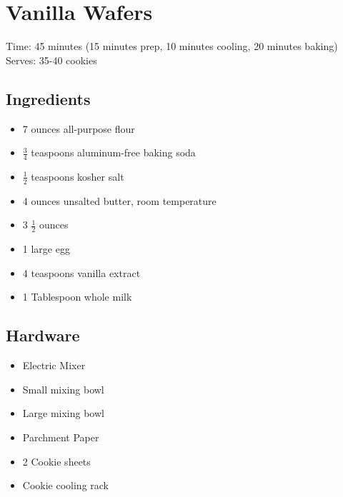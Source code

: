 \section{Vanilla Wafers}
\label{vanillaWafers}
\setcounter{secnumdepth}{0}
Time: 45 minutes (15 minutes prep, 10 minutes cooling, 20 minutes baking)
Serves: 35-40 cookies

\begin{multicols}{2}
\subsection*{Ingredients}
\begin{itemize}
    \item 7 ounces all-purpose flour
    \item \( \frac{3}{4} \) teaspoons aluminum-free baking soda
    \item \( \frac{1}{2} \) teaspoons kosher salt
    \item 4 ounces unsalted butter, room temperature
    \item 3 \( \frac{1}{2} \) ounces 
    \item 1 large egg
    \item 4 teaspoons vanilla extract
    \item 1 Tablespoon whole milk
\end{itemize}

\subsection*{Hardware}
\begin{itemize}
    \item Electric Mixer
    \item Small mixing bowl
    \item Large mixing bowl
    \item Parchment Paper
    \item 2 Cookie sheets
    \item Cookie cooling rack
\end{itemize}
\clearpage


\end{multicols}
